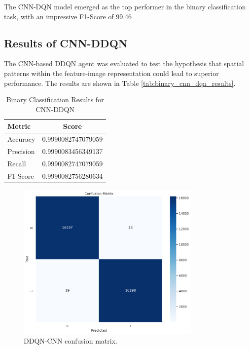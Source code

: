 \documentclass[12pt]{report}
\begin{document}
The CNN-DQN model emerged as the top performer in the binary classification task, with an impressive F1-Score of 99.46

\subsection{Results of CNN-DDQN}
The CNN-based DDQN agent was evaluated to test the hypothesis that spatial patterns within the feature-image representation could lead to superior performance. The results are shown in Table \ref{tab:binary_cnn_dqn_results}.

\begin{table}[H]
    \centering
    \caption{Binary Classification Results for CNN-DDQN}
    \label{tab:binary_cnn_ddqn_results}
    \begin{tabular}{@{}lc@{}}
        \toprule
        \textbf{Metric} & \textbf{Score} \\
        \midrule
        Accuracy & 0.9990082747079059 \\
        Precision & 0.9990083456349137 \\
        Recall & 0.9990082747079059 \\
        F1-Score & 0.9990082756280634 \\
        \bottomrule
    \end{tabular}
\end{table}

\begin{figure}[htbp]
    \centering
    \includegraphics[width=0.8\textwidth]{images/double_dqn_cnn_confusion_matrix.png}
    \caption{DDQN-CNN confusion matrix.}
    \label{fig:ddqn_cnn_confusion}
\end{figure}
\end{document}
